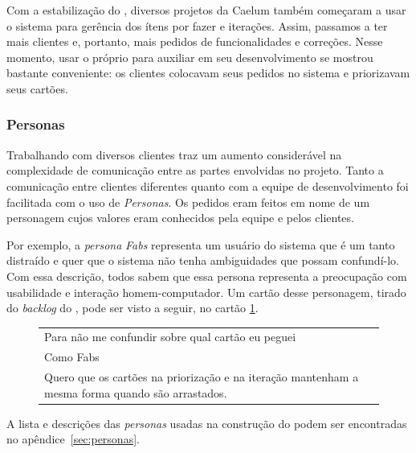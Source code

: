 Com a estabilização do \calopsita{}, diversos projetos da Caelum também começaram a usar o sistema para gerência dos ítens por fazer e iterações. Assim, passamos a ter mais clientes e, portanto, mais pedidos de funcionalidades e correções. Nesse momento, usar o próprio \calopsita{} para auxiliar em seu desenvolvimento se mostrou bastante conveniente: os clientes colocavam seus pedidos no sistema e priorizavam seus cartões.

\subsubsection*{Personas}

Trabalhando com diversos clientes traz um aumento considerável na complexidade de comunicação entre as partes envolvidas no projeto. Tanto a comunicação entre clientes diferentes quanto com a equipe de desenvolvimento foi facilitada com o uso de \textit{Personas}. Os pedidos eram feitos em nome de um personagem cujos valores eram conhecidos pela equipe e pelos clientes. 

Por exemplo, a \textit{persona} \textit{Fabs} representa um usuário do sistema que é um tanto distraído e quer que o sistema não tenha ambiguidades que possam confundí-lo. Com essa descrição, todos sabem que essa persona representa a preocupação com usabilidade e interação homem-computador. Um cartão desse personagem, tirado do \textit{backlog} do \calopsita{}, pode ser visto a seguir, no cartão \ref{tabela:fabs}.

\begin{figure}[H]
  \label{tabela:fabs}
  \begin{tabular}{|p{10cm}|}
    \hline
    Para não me confundir sobre qual cartão eu peguei \\
    Como Fabs \\
    Quero que os cartões na priorização e na iteração mantenham a mesma forma quando são arrastados. \\
    \hline
  \end{tabular}
\end{figure}

A lista e descrições das \textit{personas} usadas na construção do \calopsita{} podem ser encontradas no apêndice~\ref{sec:personas}.
